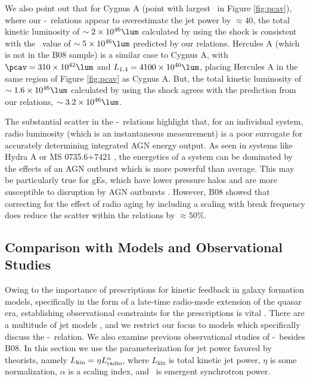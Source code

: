 \documentclass{emulateapj}
\begin{document}
We also point out that for Cygnus A (point with largest \prad\ in
Figure \ref{fig:pcav}), where our \pjet-\prad\ relations appear to
overestimate the jet power by $\approx 40$, the total kinetic
luminosity of $\sim 2\times10^{46} \lum$ calculated by
\citet{2006ApJ...644L...9W} using the shock is consistent with the
\pjet\ value of $\sim 5\times10^{46} \lum$ predicted by our
relations. Hercules A (which is not in the B08 sample) is a similar
case to Cygnus A, with $\pcav = 310\times10^{42} \lum$ and $\phigh =
4100\times10^{40} \lum$, placing Hercules A in the same region of
Figure \ref{fig:pcav} as Cygnus A. But, the total kinetic luminosity
of $\sim 1.6\times10^{46} \lum$ calculated by \citet{herca} using the
shock agrees with the prediction from our relations, $\sim
3.2\times10^{46} \lum$.

The substantial scatter in the \pjet-\prad\ relations highlight that,
for an individual system, radio luminosity (which is an instantaneous
measurement) is a poor surrogate for accurately determining integrated
AGN energy output. As seen in systems like Hydra A \citep{hydraa} or
MS 0735.6+7421 \citep{ms0735}, the energetics of a system can be
dominated by the effects of an AGN outburst which is more powerful
than average. This may be particularly true for gEs, which have lower
pressure halos and are more susceptible to disruption by AGN outbursts
\citep{2006MNRAS.372.1161W, 2008ApJ...687L..53P}. However, B08 showed
that correcting for the effect of radio aging by including a scaling
with break frequency does reduce the scatter within the relations by
$\approx 50\%$.

\subsection{Comparison with Models and Observational Studies}
\label{sec:models}

Owing to the importance of prescriptions for kinetic feedback in
galaxy formation models, specifically in the form of a late-time
radio-mode extension of the quasar era, establishing observational
constraints for the prescriptions is vital
\citep[\eg][]{2007ApJ...658L...9H}. There are a multitude of jet
models \citep[\ie][]{1973MNRAS.164..243L, 1974MNRAS.166..513S,
  1974MNRAS.169..395B, 1989ApJ...345L..21B, 2002ApJS..141..337C,
  2002ApJS..141..371C}, and we restrict our focus to models which
specifically discuss the \pjet-\prad\ relation. We also examine
previous observational studies of \pjet-\prad\ besides B08. In this
section we use the parameterization for jet power favored by
theorists, namely $L_{\mathrm{kin}} = \eta L_{\mathrm{radio}}^{\alpha}$, where
$L_{\mathrm{kin}}$ is total kinetic jet power, $\eta$ is some
normalization, $\alpha$ is a scaling index, and \prad\ is emergent
synchrotron power.
\end{document}
